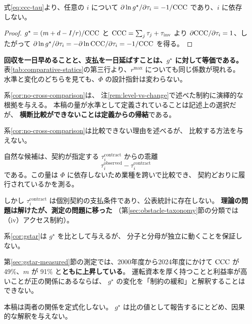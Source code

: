 \begin{proposition}[遅れ時間は限界で完全代替である]
\label{prop:tau-substitution}
式\eqref{eq:ccc-tau}より、任意の $i$ について
$\partial\ln g^\star/\partial\tau_i = -1/\mathrm{CCC}$ であり、$i$ に依存しない。
\end{proposition}

\begin{proof}
$g^\star=(m+d-I/r)/\mathrm{CCC}$ と $\mathrm{CCC}=\sum_j\tau_j+\tau_{\mathrm{inv}}$ より
$\partial\mathrm{CCC}/\partial\tau_i=1$、したがって
$\partial\ln g^\star/\partial\tau_i = -\partial\ln\mathrm{CCC}/\partial\tau_i = -1/\mathrm{CCC}$ を得る。
\end{proof}

\textbf{回収を一日早めることと、支払を一日延ばすことは、$g^\star$ に対して等価である。}
表\ref{tab:comparative-statics}の第三行より、$r^{\max}$ についても同じ係数が現れる。
水準と変化のどちらを見ても、$\Phi$ の設計指針は変わらない。

系\ref{cor:no-cross-comparison}は、
注\ref{rem:level-vs-change}で述べた制約に演繹的な根拠を与える。
本稿の量が水準として定義されていることは記述上の選択だが、
\textbf{横断比較ができないことは定義からの帰結}である。

\begin{remark}[比較可能な量を構成できない]
\label{rem:no-normalization}
系\ref{cor:no-cross-comparison}は比較できない理由を述べるが、
比較する方法を与えない。

自然な候補は、契約が指定する $\tau_i^{\mathrm{contract}}$ からの乖離
\[
\tau_i^{\mathrm{observed}} - \tau_i^{\mathrm{contract}}
\]
である。この量は $\Phi$ に依存しないため業種を跨いで比較でき、
契約どおりに履行されているかを測る。

しかし $\tau_i^{\mathrm{contract}}$ は個別契約の支払条件であり、公表統計に存在しない。
\textbf{理論の問題は解けたが、測定の問題に移った}
（第\ref{sec:obstacle-taxonomy}節の分類では（iv）アクセス制約）。
\end{remark}

\begin{remark}
\label{rem:m-ccc-independence}
系\ref{cor:gstar}は $g^\star$ を比として与えるが、
分子と分母が独立に動くことを保証しない。

第\ref{sec:gstar-measured}節の測定では、2000年度から2024年度にかけて
$\mathrm{CCC}$ が 49\%、$m$ が 91\% と\textbf{ともに上昇している}。
運転資本を厚く持つことと利益率が高いことが正の関係にあるならば、
$g^\star$ の変化を「制約の緩和」と解釈することはできない。

本稿は両者の関係を定式化しない。
$g^\star$ は比の値として報告するにとどめ、因果的な解釈を与えない。
\end{remark}

